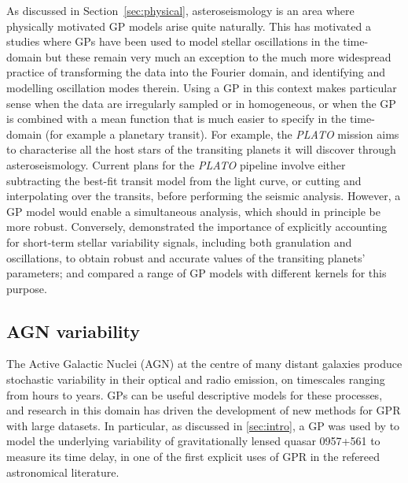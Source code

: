 \documentclass[letterpaper]{ar-1col}
\begin{document}
As discussed in Section~\ref{sec:physical}, asteroseismology is an area where physically motivated GP models arise quite naturally. This has motivated a studies where GPs have been used to model stellar oscillations in the time-domain \citep{2017AJ....154..254G, 2018ApJ...865L..20F} but these remain very much an exception to the much more widespread practice of transforming the data into the Fourier domain, and identifying and modelling oscillation modes therein. Using a GP in this context makes particular sense when the data are irregularly sampled or in homogeneous, or when the GP is combined with a mean function that is much easier to specify in the time-domain (for example a planetary transit). For example, the \textit{PLATO} mission \citep{2014ExA....38..249R} aims to characterise all the host stars of the transiting planets it will discover through asteroseismology. Current plans for the \textit{PLATO} pipeline involve either subtracting the best-fit transit model from the light curve, or cutting and interpolating over the transits, before performing the seismic analysis. However, a GP model would  enable a simultaneous analysis, which should in principle be more robust. Conversely, \citet{2020A&A...634A..75B} demonstrated the importance of 
explicitly accounting for short-term stellar variability signals, including both granulation and oscillations, to obtain robust and accurate values of the transiting planets' parameters; and compared a range of GP models with different kernels for this purpose.

\subsection{AGN variability}

The Active Galactic Nuclei (AGN) at the centre of many distant galaxies produce stochastic variability in their optical and radio emission, on timescales ranging from hours to years.
GPs can be useful descriptive models for these processes, and research in this domain has driven the development of new methods for GPR with large datasets.
In particular, as discussed in \autoref{sec:intro}, a GP was used by \citet{prh92a} to model the underlying variability of gravitationally lensed quasar 0957+561 to measure its time delay, in one of the first explicit uses of GPR in the refereed astronomical literature.
\end{document}
